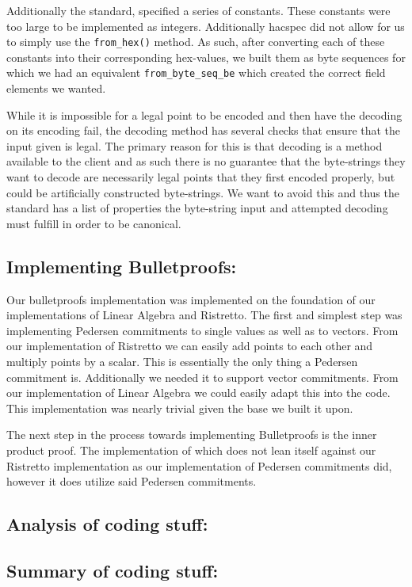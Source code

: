 \documentclass{article}
\begin{document}
Additionally the standard, specified a series of constants. These
constants were too large to be implemented as integers. Additionally
hacspec did not allow for us to simply use the \texttt{from\_hex()}
method. As such, after converting each of these constants into their
corresponding hex-values, we built them as byte sequences for which
we had an equivalent \texttt{from\_byte\_seq\_be} which created the
correct field elements we wanted.

While it is impossible for a legal point to be encoded and then have the
decoding on its encoding fail, the decoding method has several checks
that ensure that the input given is legal. The primary reason for this
is that decoding is a method available to the client and as such there is
no guarantee that the byte-strings they want to decode are necessarily
legal points that they first encoded properly, but could be artificially
constructed byte-strings. We want to avoid this and thus the standard has
a list of properties the byte-string input and attempted decoding must
fulfill in order to be canonical. 

\subsection{Implementing Bulletproofs:}

Our bulletproofs implementation was implemented on the foundation of our
implementations of Linear Algebra and Ristretto. The first and simplest
step was implementing Pedersen commitments to single values as well as to
vectors. From our implementation of Ristretto we can easily add points to
each other and multiply points by a scalar. This is essentially the only
thing a Pedersen commitment is. Additionally we needed it to support
vector commitments. From our implementation of Linear Algebra we could
easily adapt this into the code. This implementation was nearly trivial
given the base we built it upon.

The next step in the process towards implementing Bulletproofs is the
inner product proof. The implementation of which does not lean itself
against our Ristretto implementation as our implementation of Pedersen
commitments did, however it does utilize said Pedersen commitments. 

\subsection{Analysis of coding stuff:}

\subsection{Summary of coding stuff:}
\end{document}
